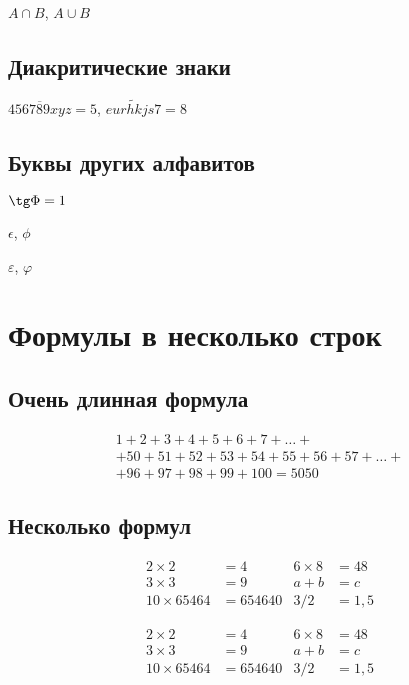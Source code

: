 \documentclass[a4paper,12pt]{article} %
\begin{document}
	$A \cap B$, $A \cup B$
	
	\subsection{Диакритические знаки}
	
	$\overline{456789xyz}=5$, $\widetilde{eurhkjs7} = 8$
	
	\subsection{Буквы других алфавитов}
	
	$\tg \Phi = 1$
	
	$\epsilon$, $\phi$
	
	$\varepsilon$, $\varphi$
	
	\section{Формулы в несколько строк}
	
	\subsection{Очень длинная формула}
	
	\begin{multline}
		1+ 2+3+4+5+6+7+\dots + \\ 
		+ 50+51+52+53+54+55+56+57 + \dots + \\ 
		+ 96+97+98+99+100=5050 \tag{S} \label{eq:sum}
	\end{multline}
	
	
	\subsection{Несколько формул}
	
	\begin{align*}
		2\times 2 &= 4 & 6\times 8 &= 48 \\
		3\times 3 &= 9 & a+b &= c\\
		10 \times 65464 &= 654640 & 3/2&=1,5
	\end{align*}
	
	\begin{equation}
		\begin{aligned}
			2\times 2 &= 4 & 6\times 8 &= 48 \\
			3\times 3 &= 9 & a+b &= c\\
			10 \times 65464 &= 654640 & 3/2&=1,5
		\end{aligned}
	\end{equation}
	
\end{document}
